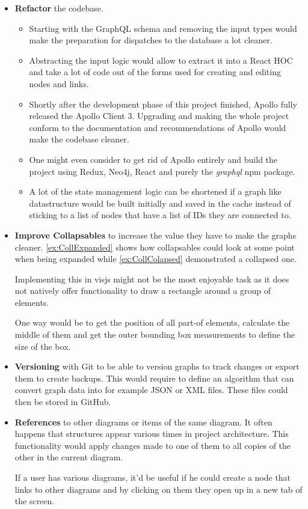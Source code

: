 \begin{itemize}
\item \textbf{Refactor} the codebase.
\begin{itemize}
\item Starting with the GraphQL schema and removing the input types would make the preparation for dispatches to the database a lot cleaner. 
\item Abstracting the input logic would allow to extract it into a React HOC and take a lot of code out of the forms used for creating and editing nodes and links.
\item Shortly after the development phase of this project finished, Apollo fully released the Apollo Client 3. Upgrading and making the whole project conform to the documentation and recommendations of Apollo would make the codebase cleaner.
\item One might even consider to get rid of Apollo entirely and build the project using Redux, Neo4j, React and purely the \emph{graphql} npm package.
\item A lot of the state management logic can be shortened if a graph like datastructure would be built initially and saved in the cache instead of sticking to a list of nodes that have a list of IDs they are connected to.
\end{itemize}

\item \textbf{Improve Collapsables} to increase the value they have to make the graphs cleaner. \autoref{ex:CollExpanded} shows how collapsables could look at some point when being expanded while \autoref{ex:CollColapsed} demonstrated a collapsed one.

Implementing this in visjs might not be the most enjoyable task as it does not natively offer functionality to draw a rectangle around a group of elements.

One way would be to get the position of all part-of elements, calculate the middle of them and get the outer bounding box measurements to define the size of the box. 

\item \textbf{Versioning} with Git to be able to version graphs to track changes or export them to create backups. This would require to define an algorithm that can convert graph data into for example JSON or XML files. These files could then be stored in GitHub. 

\item \textbf{References} to other diagrams or items of the same diagram. 
It often happens that structures appear various times in project architecture. This functionality would apply changes made to one of them to all copies of the other in the current diagram.

If a user has various diagrams, it'd be useful if he could create a node that links to other diagrams and by clicking on them they open up in a new tab of the screen. 
\end{itemize}

